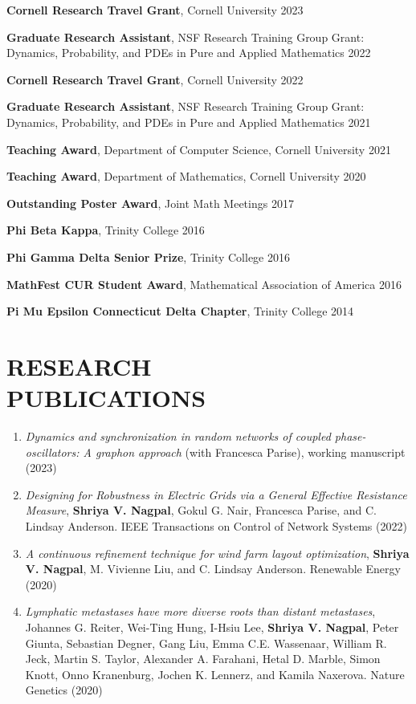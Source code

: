 \documentclass[margin]{res} %
\begin{document}
\begin{resume}
{\bf Cornell Research Travel Grant}, Cornell University \hfill2023 

{\bf Graduate Research Assistant}, NSF Research Training Group Grant: \\ Dynamics, Probability, and PDEs in Pure and Applied Mathematics \hfill2022 

{\bf Cornell Research Travel Grant}, Cornell University \hfill2022 

{\bf Graduate Research Assistant}, NSF Research Training Group Grant: \\ Dynamics, Probability, and PDEs in Pure and Applied Mathematics \hfill2021 

{\bf Teaching Award}, Department of Computer Science, Cornell University \hfill2021

{\bf Teaching Award}, Department of Mathematics, Cornell University \hfill2020

{\bf Outstanding Poster Award}, Joint Math Meetings \hfill2017

{\bf Phi Beta Kappa}, Trinity College \hfill2016

{\bf Phi Gamma Delta Senior Prize}, Trinity College \hfill2016

{\bf MathFest CUR Student Award}, Mathematical Association of America \hfill2016

{\bf Pi Mu Epsilon Connecticut Delta Chapter}, Trinity College \hfill2014


\section{RESEARCH\\PUBLICATIONS}
\begin{enumerate}
    \item {\sl Dynamics and synchronization in random networks of coupled phase-oscillators: A graphon approach} (with Francesca Parise), working manuscript (2023)
	
    \item {\sl Designing for Robustness in Electric Grids via a General Effective Resistance Measure}, \textbf{Shriya V. Nagpal}, Gokul G. Nair, Francesca Parise, and C. Lindsay Anderson. IEEE Transactions on Control of Network Systems (2022)
	 	
    \item {\sl A continuous refinement technique for wind farm layout optimization}, \textbf{Shriya V. Nagpal}, M. Vivienne Liu, and C. Lindsay Anderson. Renewable Energy (2020)

    \item {\sl Lymphatic metastases have more diverse roots than distant metastases}, Johannes G. Reiter, Wei-Ting Hung, I-Hsiu Lee, \textbf{Shriya V. Nagpal}, Peter Giunta, Sebastian Degner, Gang Liu, Emma C.E. Wassenaar, William R. Jeck, Martin S. Taylor, Alexander A. Farahani, Hetal D. Marble, Simon Knott, Onno Kranenburg, Jochen K. Lennerz, and Kamila Naxerova. Nature Genetics (2020)


\end{enumerate}
\end{resume}
\end{document}
